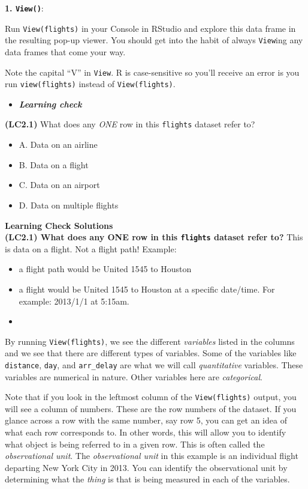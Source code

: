 \documentclass[12pt,]{krantz}
\providecommand{\tightlist}{%
  \setlength{\itemsep}{0pt}\setlength{\parskip}{0pt}}
\newenvironment{rmdblock}[1]
  {\begin{shaded*}
  \begin{itemize}
  \renewcommand{\labelitemi}{
    \raisebox{-.7\height}[0pt][0pt]{
    }
  }
  \item
  }
  {
  \end{itemize}
  \end{shaded*}
  }
\newenvironment{learncheck}
  {\begin{rmdblock}{warning}}
  {\end{rmdblock}}
\theoremstyle{definition}
\theoremstyle{definition}
\theoremstyle{definition}
\theoremstyle{remark}
\begin{document}
\textbf{1. \texttt{View()}}:

Run \texttt{View(flights)} in your Console in RStudio and explore this
data frame in the resulting pop-up viewer. You should get into the habit
of always \texttt{View}ing any data frames that come your way.

Note the capital ``V'' in \texttt{View}. R is case-sensitive so you'll
receive an error is you run \texttt{view(flights)} instead of
\texttt{View(flights)}.

\begin{learncheck}
\textbf{\emph{Learning check}}
\end{learncheck}

\textbf{(LC2.1)} What does any \emph{ONE} row in this \texttt{flights}
dataset refer to?

\begin{itemize}
\tightlist
\item
  A. Data on an airline
\item
  B. Data on a flight
\item
  C. Data on an airport
\item
  D. Data on multiple flights
\end{itemize}

\textbf{Learning Check Solutions}\\
\textbf{(LC2.1) What does any ONE row in this \texttt{flights} dataset
refer to?} This is data on a flight. Not a flight path! Example:

\begin{itemize}
\tightlist
\item
  a flight path would be United 1545 to Houston
\item
  a flight would be United 1545 to Houston at a specific date/time. For
  example: 2013/1/1 at 5:15am.
\end{itemize}

\begin{learncheck}

\end{learncheck}

By running \texttt{View(flights)}, we see the different \emph{variables}
listed in the columns and we see that there are different types of
variables. Some of the variables like \texttt{distance}, \texttt{day},
and \texttt{arr\_delay} are what we will call \emph{quantitative}
variables. These variables are numerical in nature. Other variables here
are \emph{categorical}.

Note that if you look in the leftmost column of the
\texttt{View(flights)} output, you will see a column of numbers. These
are the row numbers of the dataset. If you glance across a row with the
same number, say row 5, you can get an idea of what each row corresponds
to. In other words, this will allow you to identify what object is being
referred to in a given row. This is often called the \emph{observational
unit}. The \emph{observational unit} in this example is an individual
flight departing New York City in 2013. You can identify the
observational unit by determining what the \emph{thing} is that is being
measured in each of the variables.
\end{document}
